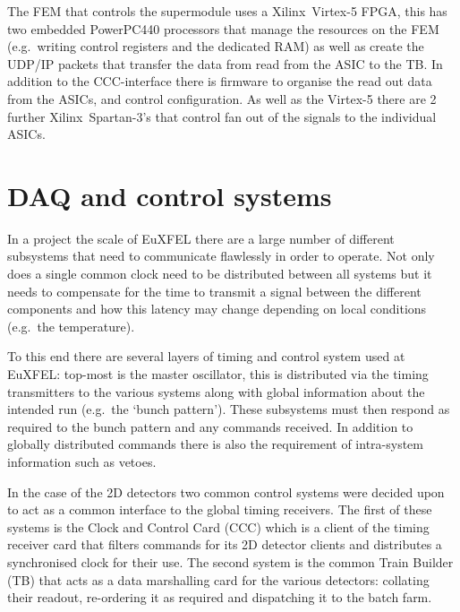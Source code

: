The FEM that controls the supermodule uses a Xilinx~Virtex-5 FPGA, this has two embedded PowerPC440 processors that manage the resources on the FEM (e.g.\ writing control registers and the dedicated RAM) as well as create the UDP/IP packets that transfer the data from read from the ASIC to the TB. In addition to the CCC-interface there is firmware to organise the read out data from the ASICs, and control configuration. As well as the Virtex-5 there are 2 further Xilinx~Spartan-3's that control fan out of the signals to the individual ASICs.
\section{DAQ and control systems} %
\label{sec:daq_and_control_systems}
In a project the scale of EuXFEL there are a large number of different subsystems that need to communicate flawlessly in order to operate. Not only does a single common clock need to be distributed between all systems but it needs to compensate for the time to transmit a signal between the different components and how this latency may change depending on local conditions (e.g.\ the temperature).

To this end there are several layers of timing and control system used at EuXFEL: top-most is the master oscillator, this is distributed via the timing transmitters to the various systems along with global information about the intended run (e.g.\ the `bunch pattern'). These subsystems must then respond as required to the bunch pattern and any commands received. In addition to globally distributed commands there is also the requirement of intra-system information such as vetoes. 

In the case of the 2D detectors two common control systems were decided upon to act as a common interface to the global timing receivers. The first of these systems is the Clock and Control Card (CCC) which is a client of the timing receiver card that filters commands for its 2D detector clients and distributes a synchronised clock for their use. The second system is the common Train Builder (TB) that acts as a data marshalling card for the various detectors: collating their readout, re-ordering it as required and dispatching it to the batch farm.

